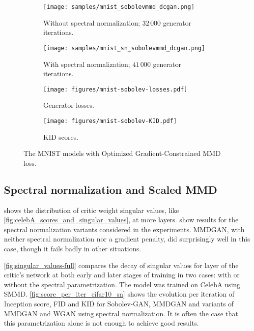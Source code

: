 \documentclass{article}
\begin{document}
\begin{figure}
  \begin{subfigure}{.2\linewidth}
    \texttt{[image: samples/mnist\_sobolevmmd\_dcgan.png]}
    \caption{Without spectral normalization; $32\,000$ generator iterations.}
    \label{fig:mnist:sobolev:nosn}
  \end{subfigure}
  \begin{subfigure}{.2\linewidth}
    \texttt{[image: samples/mnist\_sn\_sobolevmmd\_dcgan.png]}
    \caption{With spectral normalization; $41\,000$ generator iterations.}
    \label{fig:mnist:sobolev:sn}
  \end{subfigure}
  \begin{subfigure}{.28\linewidth}
    \texttt{[image: figures/mnist-sobolev-losses.pdf]}
    \caption{Generator losses.}
    \label{fig:mnist:loss}
  \end{subfigure}
  \begin{subfigure}{.28\linewidth}
    \texttt{[image: figures/mnist-sobolev-KID.pdf]}
    \caption{KID scores.}
    \label{fig:mnist:kid}
  \end{subfigure}
  \caption{The MNIST models with Optimized Gradient-Constrained MMD loss.}
\end{figure}



\subsection{Spectral normalization and Scaled MMD} \label{appendix:smmd_vs_sn}
 shows the distribution of critic weight singular values, like \cref{fig:celebA_scores_and_singular_values}, at more layers.
show results for the spectral normalization variants considered in the experiments.
MMDGAN, with neither spectral normalization nor a gradient penalty, did surprisingly well in this case, though it fails badly in other situations.

\cref{fig:singular_values-full} compares the decay of singular values for layer of the critic's network at both early and later stages of training in two cases: with or without the spectral parametrization. The model was trained on CelebA using SMMD.
\cref{fig:score_per_iter_cifar10_sn} shows the evolution per iteration of Inception score, FID and KID for Sobolev-GAN, MMDGAN and variants of MMDGAN and WGAN using spectral normalization. It is often the case that this parametrization alone is not enough to achieve good results.
\end{document}
